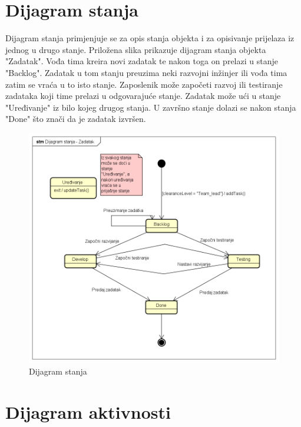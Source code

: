 		\section{Dijagram stanja}
			
			Dijagram stanja primjenjuje se za opis stanja objekta i za opisivanje prijelaza iz jednog u drugo stanje. Priložena slika prikazuje dijagram stanja objekta "Zadatak". Vođa tima kreira novi zadatak te nakon toga on prelazi u stanje "Backlog". Zadatak u tom stanju preuzima neki razvojni inžinjer ili vođa tima zatim se vraća u to isto stanje. Zaposlenik može započeti razvoj ili testiranje zadataka koji time prelazi u odgovarajuće stanje. Zadatak može ući u stanje "Uređivanje" iz bilo kojeg drugog stanja. U završno stanje dolazi se nakon stanja "Done" što znači da je zadatak izvršen.
			\begin{figure}[H]
				\includegraphics[width=\textwidth]{slike/Dijagram_stanja.png}
				\centering
				\caption{Dijagram stanja}
				\label{fig:classd_middle}
			\end{figure}
			
			
			\eject 
		
		\section{Dijagram aktivnosti}
			
